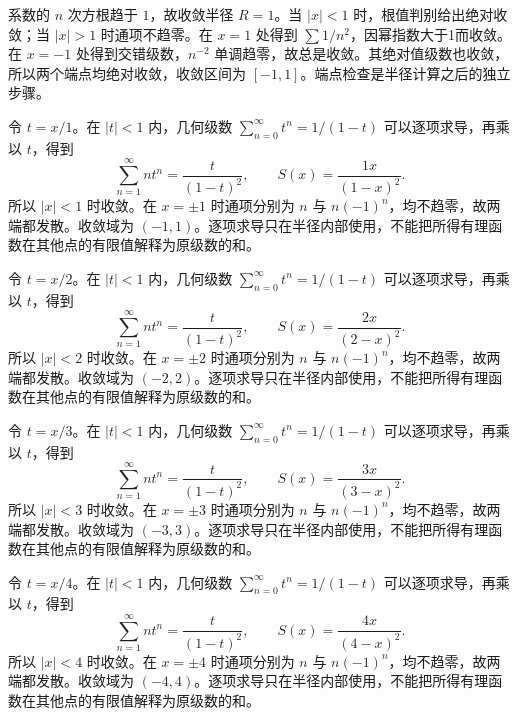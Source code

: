 \documentclass[UTF8,12pt,a4paper,fontset=fandol]{ctexart}
\begin{document}
\begin{solve}\label{ans:c26q7}
系数的 $n$ 次方根趋于 $1$，故收敛半径 $R=1$。当 $|x|<1$ 时，根值判别给出绝对收敛；当 $|x|>1$ 时通项不趋零。在 $x=1$ 处得到 $\sum1/n^{2}$，因幂指数大于1而收敛。在 $x=-1$ 处得到交错级数，$n^{-2}$ 单调趋零，故总是收敛。其绝对值级数也收敛，所以两个端点均绝对收敛，收敛区间为 $[-1,1]$。端点检查是半径计算之后的独立步骤。
\end{solve}

\begin{solve}\label{ans:c26q8}
令 $t=x/1$。在 $|t|<1$ 内，几何级数 $\sum_{n=0}^\infty t^n=1/(1-t)$ 可以逐项求导，再乘以 $t$，得到
\[
\sum_{n=1}^\infty nt^n=\frac{t}{(1-t)^2},\qquad S(x)=\frac{1x}{(1-x)^2}.
\]
所以 $|x|<1$ 时收敛。在 $x=\pm 1$ 时通项分别为 $n$ 与 $n(-1)^n$，均不趋零，故两端都发散。收敛域为 $(-1,1)$。逐项求导只在半径内部使用，不能把所得有理函数在其他点的有限值解释为原级数的和。
\end{solve}

\begin{solve}\label{ans:c26q9}
令 $t=x/2$。在 $|t|<1$ 内，几何级数 $\sum_{n=0}^\infty t^n=1/(1-t)$ 可以逐项求导，再乘以 $t$，得到
\[
\sum_{n=1}^\infty nt^n=\frac{t}{(1-t)^2},\qquad S(x)=\frac{2x}{(2-x)^2}.
\]
所以 $|x|<2$ 时收敛。在 $x=\pm 2$ 时通项分别为 $n$ 与 $n(-1)^n$，均不趋零，故两端都发散。收敛域为 $(-2,2)$。逐项求导只在半径内部使用，不能把所得有理函数在其他点的有限值解释为原级数的和。
\end{solve}

\begin{solve}\label{ans:c26q10}
令 $t=x/3$。在 $|t|<1$ 内，几何级数 $\sum_{n=0}^\infty t^n=1/(1-t)$ 可以逐项求导，再乘以 $t$，得到
\[
\sum_{n=1}^\infty nt^n=\frac{t}{(1-t)^2},\qquad S(x)=\frac{3x}{(3-x)^2}.
\]
所以 $|x|<3$ 时收敛。在 $x=\pm 3$ 时通项分别为 $n$ 与 $n(-1)^n$，均不趋零，故两端都发散。收敛域为 $(-3,3)$。逐项求导只在半径内部使用，不能把所得有理函数在其他点的有限值解释为原级数的和。
\end{solve}

\begin{solve}\label{ans:c26q11}
令 $t=x/4$。在 $|t|<1$ 内，几何级数 $\sum_{n=0}^\infty t^n=1/(1-t)$ 可以逐项求导，再乘以 $t$，得到
\[
\sum_{n=1}^\infty nt^n=\frac{t}{(1-t)^2},\qquad S(x)=\frac{4x}{(4-x)^2}.
\]
所以 $|x|<4$ 时收敛。在 $x=\pm 4$ 时通项分别为 $n$ 与 $n(-1)^n$，均不趋零，故两端都发散。收敛域为 $(-4,4)$。逐项求导只在半径内部使用，不能把所得有理函数在其他点的有限值解释为原级数的和。
\end{solve}
\end{document}

